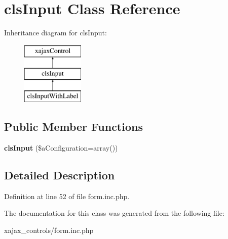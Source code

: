 \hypertarget{classclsInput}{
\section{clsInput Class Reference}
\label{classclsInput}
}
Inheritance diagram for clsInput:\begin{figure}[H]
\begin{center}
\leavevmode
\includegraphics[height=3.000000cm]{classclsInput}
\end{center}
\end{figure}
\subsection*{Public Member Functions}
\begin{DoxyCompactItemize}
\item 
\hypertarget{classclsInput_a04fe27d3a5ba574d93c57779eea8bc78}{
{\bfseries clsInput} (\$aConfiguration=array())}
\label{classclsInput_a04fe27d3a5ba574d93c57779eea8bc78}

\end{DoxyCompactItemize}


\subsection{Detailed Description}


Definition at line 52 of file form.inc.php.



The documentation for this class was generated from the following file:\begin{DoxyCompactItemize}
\item 
xajax\_\-controls/form.inc.php\end{DoxyCompactItemize}
